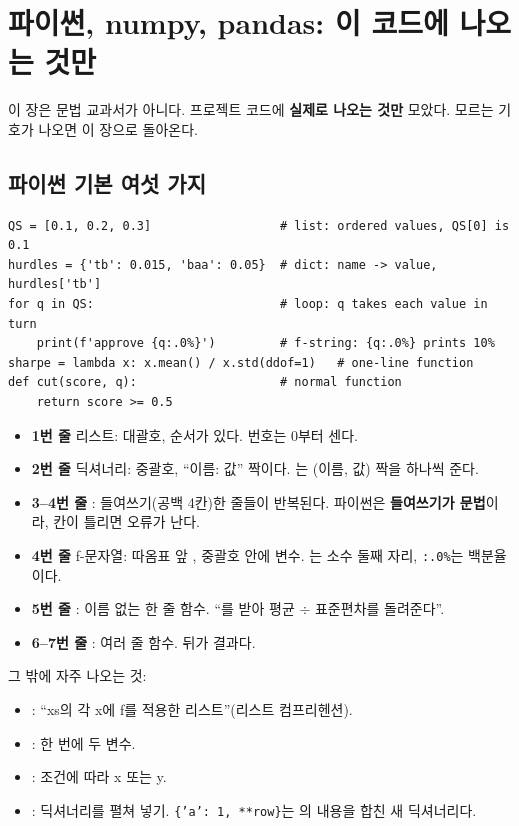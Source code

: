 \chapter{파이썬, numpy, pandas: 이 코드에 나오는 것만}

이 장은 문법 교과서가 아니다. 프로젝트 코드에 \textbf{실제로 나오는 것만} 모았다. 모르는 기호가 나오면 이 장으로 돌아온다.

\section{파이썬 기본 여섯 가지}
\begin{lstlisting}
QS = [0.1, 0.2, 0.3]                  # list: ordered values, QS[0] is 0.1
hurdles = {'tb': 0.015, 'baa': 0.05}  # dict: name -> value, hurdles['tb']
for q in QS:                          # loop: q takes each value in turn
    print(f'approve {q:.0%}')         # f-string: {q:.0%} prints 10%
sharpe = lambda x: x.mean() / x.std(ddof=1)   # one-line function
def cut(score, q):                    # normal function
    return score >= 0.5
\end{lstlisting}
\begin{itemize}[leftmargin=*]
\item \textbf{1번 줄} 리스트: 대괄호, 순서가 있다. 번호는 0부터 센다.
\item \textbf{2번 줄} 딕셔너리: 중괄호, ``이름: 값'' 짝이다. 는 (이름, 값) 짝을 하나씩 준다.
\item \textbf{3--4번 줄} : 들여쓰기(공백 4칸)한 줄들이 반복된다. 파이썬은 \textbf{들여쓰기가 문법}이라, 칸이 틀리면 오류가 난다.
\item \textbf{4번 줄} f-문자열: 따옴표 앞 , 중괄호 안에 변수. 는 소수 둘째 자리, \texttt{:.0\%}는 백분율이다.
\item \textbf{5번 줄} : 이름 없는 한 줄 함수. ``를 받아 평균 \ensuremath{\div} 표준편차를 돌려준다''.
\item \textbf{6--7번 줄} : 여러 줄 함수.  뒤가 결과다.
\end{itemize}
그 밖에 자주 나오는 것:
\begin{itemize}[leftmargin=*]
\item \ft{[f(x) for x in xs]}: ``xs의 각 x에 f를 적용한 리스트''(리스트 컴프리헨션).
\item {}: 한 번에 두 변수.
\item {}: 조건에 따라 x 또는 y.
\item {}: 딕셔너리를 펼쳐 넣기. \texttt{\{'a': 1, **row\}}는 의 내용을 합친 새 딕셔너리다.
\end{itemize}

